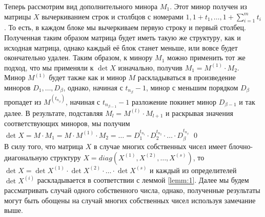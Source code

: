 \documentclass[11pt, a4paper]{article}
\begin{document}
Теперь рассмотрим вид дополнительного минора $M_1$. Этот минор получен из матрицы $X$ вычеркиванием строк и столбцов с номерами
$1, 1 + t_1, \dots, 1 + \displaystyle \sum_{i = 1}^{m}{t_i}$. То есть, в каждом блоке мы вычеркиваем первую строку и первый столбец. Полученная таким образом
матрица будет иметь такую же структуру, как и исходная матрица, однако каждый её блок станет меньше, или вовсе будет окончательно удален.
Таким образом, к минору $M_1$ можно применить тот же подход, что мы применяли к $\det X$ изначально, получив $M_1 = M^{(1)} \cdot M_2$. Минор $M^{(1)}$ будет
также как и минор $M$ раскладываться в произведение миноров $D_1, \dots, D_{\beta}$, однако, начиная с $t_{n_{\beta}} - 1$, минор с меньшим порядком $D_{\beta}$
пропадет из $M^{(t_{n_{\beta}})}$, начиная с $t_{n_{\beta - 1}} - 1$ разложение покинет минор $D_{\beta - 1}$ и так далее.
В результате, подставляя $M_l = M^{(l)} \cdot M_{l + 1}$ и раскрывая значения соответствующих миноров,
мы получим $\det X = M \cdot M_1 = M \cdot M^{(1)} \cdot M_2 = \dots = D_1^{t_{n_1}} \cdot D_2^{t_{n_2}} \cdot \ldots \cdot D_{\beta}^{t_{n_{\beta}}}$ \qed
\\

В силу того, что матрица $X$ в случае многих собственных чисел имеет блочно-диагональную структуру $X = diag(X^{(1)}, X^{(2)}, \dots, X^{(s)})$, то $\det X = \det X^{(1)} \cdot \det X^{(2)} \cdot \ldots
\cdot \det X^{(s)}$ и каждый из определителей $\det X^{(i)}$ раскладывается в соответствии с леммой \ref{lemm:1}. Далее мы будем рассматривать случай одного собственного
числа, однако, полученные результаты могут быть обощены на случай многих собственных чисел используя замечание выше.
\end{document}
